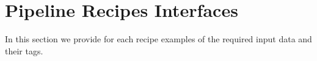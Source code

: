 \section{\label{pipeline_recipe_interfaces}Pipeline Recipes Interfaces} 

In this section we provide for each recipe examples of 
the required input data and 
their tags. 

